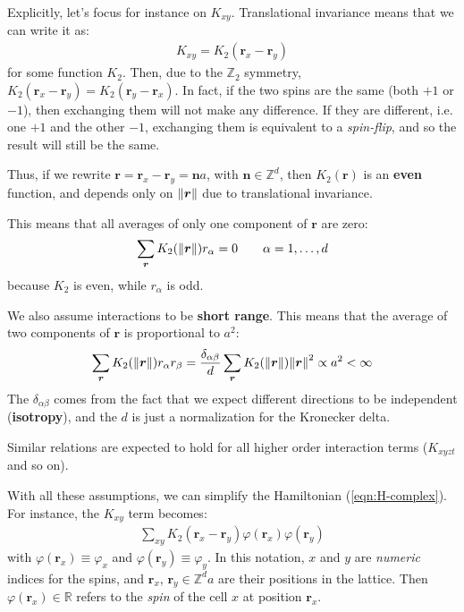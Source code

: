 \documentclass[../../main.tex]{subfiles}
\begin{document}
\medskip

Explicitly, let's focus for instance on $K_{xy}$. Translational invariance means that we can write it as:
\begin{align*}
    K_{xy} = K_2(\bm{r}_x - \bm{r}_y)
\end{align*}
for some function $K_2$. Then, due to the $\mathbb{Z}_2$ symmetry, $K_2(\bm{r}_x - \bm{r}_y) = K_2(\bm{r}_y - \bm{r}_x)$. In fact, if the two spins are the same (both $+1$ or $-1$), then exchanging them will not make any difference. If they are different, i.e. one $+1$ and the other $-1$, exchanging them is equivalent to a \textit{spin-flip}, and so the result will still be the same. 

Thus, if we rewrite $\bm{r} = \bm{r}_x - \bm{r}_y = \bm{n} a$, with $\bm{n} \in \mathbb{Z}^d$, then $K_2(\bm{r})$ is an \textbf{even} function, and depends only on $\norm{\bm{r}}$ due to translational invariance.

This means that all averages of only one component of $\bm{r}$ are zero:
\begin{align}\label{eqn:r-average}
    \sum_{\bm{r}} K_2(\norm{\bm{r}}) r_\alpha = 0 \qquad \alpha=1,\dots,d
\end{align}
because $K_2$ is even, while $r_\alpha$ is odd.

\medskip

We also assume interactions to be \textbf{short range}. This means that the average of two components of $\bm{r}$ is proportional to $a^2$: 
\begin{align}\label{eqn:rr-average}
    \sum_{\bm{r}} K_2(\norm{\bm{r}}) r_\alpha r_\beta = \frac{\delta_{\alpha \beta}}{d}  \sum_{\bm{r}} K_2(\norm{\bm{r}}) \norm{\bm{r}}^2 \propto a^2 < \infty
\end{align} 
The $\delta_{\alpha \beta}$ comes from the fact that we expect different directions to be independent (\textbf{isotropy}), and the $d$ is just a normalization for the Kronecker delta.

\medskip

Similar relations are expected to hold for all higher order interaction terms ($K_{xyzt}$ and so on).

\medskip

With all these assumptions, we can simplify the Hamiltonian (\ref{eqn:H-complex}). For instance, the $K_{xy}$ term becomes:
\begin{align*}
    \sum_{xy} K_2(\bm{r}_x - \bm{r}_y) \varphi(\bm{r}_x) \varphi(\bm{r}_y)
\end{align*}
with $\varphi(\bm{r}_x) \equiv \varphi_x$ and $\varphi(\bm{r}_y) \equiv \varphi_y$. In this notation, $x$ and $y$ are \textit{numeric} indices for the spins, and $\bm{r}_x$, $\bm{r}_y \in \mathbb{Z}^d a$ are their positions in the lattice. Then $\varphi(\bm{r}_x) \in \mathbb{R}$ refers to the \textit{spin} of the cell $x$ at position $\bm{r}_x$. 
\end{document}
